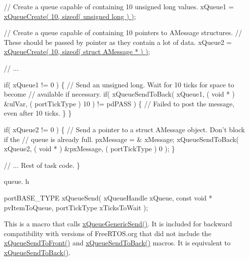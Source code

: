 \begin{DoxyPre}   // Create a queue capable of containing 10 unsigned long values.
   xQueue1 = \hyperlink{queue_8h_aeb858b824bd74a934ea7ebb81af2a6bb}{xQueueCreate( 10, sizeof( unsigned long ) )};\end{DoxyPre}



\begin{DoxyPre}   // Create a queue capable of containing 10 pointers to AMessage structures.
   // These should be passed by pointer as they contain a lot of data.
   xQueue2 = \hyperlink{queue_8h_aeb858b824bd74a934ea7ebb81af2a6bb}{xQueueCreate( 10, sizeof( struct AMessage * ) )};\end{DoxyPre}



\begin{DoxyPre}   // ...\end{DoxyPre}



\begin{DoxyPre}   if( xQueue1 != 0 )
   \{
    // Send an unsigned long.  Wait for 10 ticks for space to become
    // available if necessary.
    if( xQueueSendToBack( xQueue1, ( void * ) \&ulVar, ( portTickType ) 10 ) != pdPASS )
    \{
        // Failed to post the message, even after 10 ticks.
    \}
   \}\end{DoxyPre}



\begin{DoxyPre}   if( xQueue2 != 0 )
   \{
    // Send a pointer to a struct AMessage object.  Don't block if the
    // queue is already full.
    pxMessage = \& xMessage;
    xQueueSendToBack( xQueue2, ( void * ) \&pxMessage, ( portTickType ) 0 );
   \}\end{DoxyPre}



\begin{DoxyPre}   // ... Rest of task code.
\}
\end{DoxyPre}


queue. h 
\begin{DoxyPre}
portBASE\_TYPE xQueueSend(
                          xQueueHandle xQueue,
                          const void * pvItemToQueue,
                          portTickType xTicksToWait
                     );
  \end{DoxyPre}


This is a macro that calls \hyperlink{queue_8h_a1ff8f61508bc9c0fa0abc44750fc1981}{x\+Queue\+Generic\+Send()}. It is included for backward compatibility with versions of Free\+R\+T\+O\+S.\+org that did not include the \hyperlink{queue_8h_aa612fcc2b1ceee0200f34b942e300b41}{x\+Queue\+Send\+To\+Front()} and \hyperlink{queue_8h_a81d24a2c1199d58efb76fbee15853112}{x\+Queue\+Send\+To\+Back()} macros. It is equivalent to \hyperlink{queue_8h_a81d24a2c1199d58efb76fbee15853112}{x\+Queue\+Send\+To\+Back()}.

